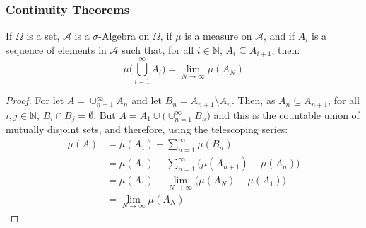                 \subsubsection{Continuity Theorems}
                    \begin{theorem}
                        If $\Omega$ is a set, $\mathcal{A}$ is a
                        $\sigma\text{-Algebra}$ on $\Omega$, if
                        $\mu$ is a measure on $\mathcal{A}$, and if
                        $A_{i}$ is a sequence of elements in $\mathcal{A}$
                        such that, for all $i\in\mathbb{N}$,
                        $A_{i}\subseteq{A}_{i+1}$, then:
                        \begin{equation}
                            \mu\Big(\bigcup_{i=1}^{\infty}A_{i}\Big)
                            =\underset{N\rightarrow\infty}{\lim}
                            \mu(A_{N})
                        \end{equation}
                    \end{theorem}
                    \begin{proof}
                        For let $A=\cup_{n=1}^{\infty}A_{n}$ and let
                        $B_{n}=A_{n+1}\setminus{A}_{n}$. Then, as
                        $A_{n}\subseteq{A}_{n+1}$, for all
                        $i,j\in\mathbb{N}$, $B_{i}\cap{B}_{j}=\emptyset$.
                        But $A=A_{1}\cup\Big(\cup_{n=1}^{\infty}B_{n}\Big)$
                        and this is the countable union of mutually
                        disjoint sets, and therefore, using the
                        telescoping series:
                        \begin{align}
                            \mu(A)&=\mu(A_{1})+
                            \sum_{n=1}^{\infty}\mu(B_{n})\\
                            &=\mu(A_{1})+\sum_{n=1}^{\infty}
                            \Big(\mu(A_{n+1})-\mu(A_{n})\Big)\\
                            &=\mu(A_{1})+
                            \underset{N\rightarrow\infty}{\lim}
                            \Big(\mu(A_{N})-\mu(A_{1})\Big)\\
                            &=\underset{N\rightarrow\infty}{\lim}
                            \mu(A_{N})
                        \end{align}
                    \end{proof}
